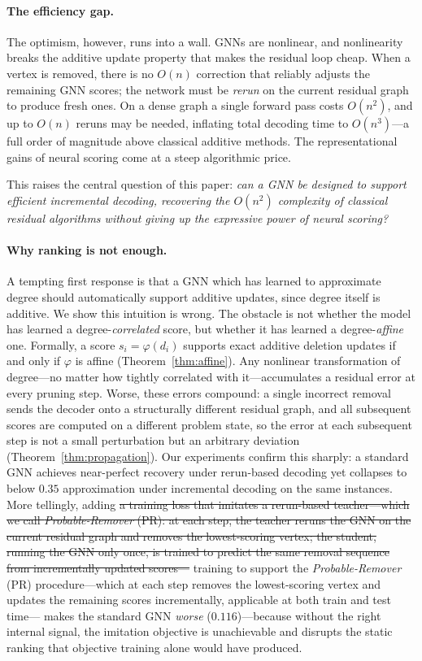 \documentclass[11pt]{article}
\newcommand{\change}[1]{{\color{red}#1}}
\theoremstyle{plain}
\theoremstyle{definition}
\theoremstyle{remark}
\begin{document}
\paragraph{The efficiency gap.}
The optimism, however, runs into a wall. GNNs are nonlinear, and nonlinearity breaks
the additive update property that makes the residual loop cheap. When a vertex is
removed, there is no $O(n)$ correction that reliably adjusts the remaining GNN scores;
the network must be \emph{rerun} on the current residual graph to produce fresh ones.
On a dense graph a single forward pass costs $O(n^2)$, and up to $O(n)$ reruns may be
needed, inflating total decoding time to $O(n^3)$---a full order of magnitude above
classical additive methods. The representational gains of neural scoring come at a
steep algorithmic price.

This raises the central question of this paper: \emph{can a GNN be designed to
  support efficient incremental decoding, recovering the $O(n^2)$ complexity of
  classical residual algorithms without giving up the expressive power of neural
scoring?}

\paragraph{Why ranking is not enough.}
A tempting first response is that a GNN which has learned to approximate degree should
automatically support additive updates, since degree itself is additive. We show this
intuition is wrong. The obstacle is not whether the model has learned a
degree-\emph{correlated} score, but whether it has learned a degree-\emph{affine}
one. Formally, a score $s_i = \varphi(d_i)$ supports exact additive deletion updates
if and only if $\varphi$ is affine (Theorem~\ref{thm:affine}). Any nonlinear
transformation of degree---no matter how tightly correlated with it---accumulates a
residual error at every pruning step. Worse, these errors compound: a single incorrect
removal sends the decoder onto a structurally different residual graph, and all
subsequent scores are computed on a different problem state, so the error at each
subsequent step is not a small perturbation but an arbitrary deviation
(Theorem~\ref{thm:propagation}). Our experiments confirm this sharply: a standard GNN
achieves near-perfect recovery under rerun-based decoding yet collapses to below
$0.35$ approximation under incremental decoding on the same instances. More tellingly,
adding \st{a training loss that imitates a rerun-based teacher---which we call \emph{Probable-Remover} (PR): at each step, the teacher reruns the GNN on the current residual graph and removes the lowest-scoring vertex; the student, running the GNN only once, is trained to predict the same removal sequence from incrementally updated scores---} \change{training to support the \emph{Probable-Remover} (PR) procedure---which at each step removes the lowest-scoring vertex and updates the remaining scores incrementally, applicable at both train and test time---} makes
the standard GNN \emph{worse} ($0.116$)---because without the right internal signal,
the imitation objective is unachievable and disrupts the static ranking that objective
training alone would have produced.
\end{document}
